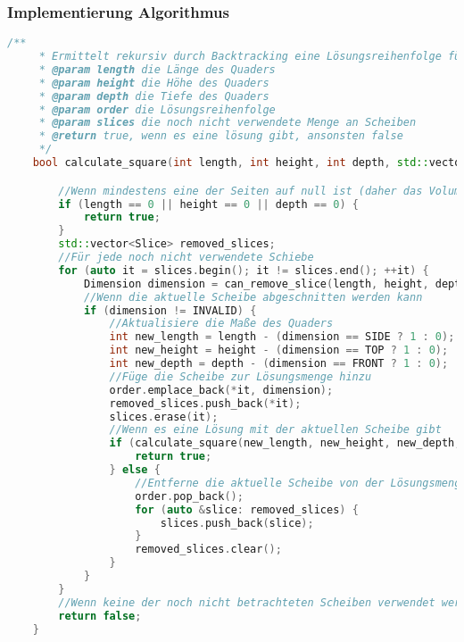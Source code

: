 \documentclass[a4paper,10pt,ngerman]{scrartcl}
\begin{document}
    \subsubsection{Implementierung Algorithmus}
    \begin{lstlisting}[frame=single,language=C++,title=Methode calculate\_square,breaklines=true,label={lst:code_calculateSquare}]
    /**
     * Ermittelt rekursiv durch Backtracking eine Lösungsreihenfolge für die gegebene Menge an Scheiben.
     * @param length die Länge des Quaders
     * @param height die Höhe des Quaders
     * @param depth die Tiefe des Quaders
     * @param order die Lösungsreihenfolge
     * @param slices die noch nicht verwendete Menge an Scheiben
     * @return true, wenn es eine lösung gibt, ansonsten false
     */
    bool calculate_square(int length, int height, int depth, std::vector<std::pair<Slice, Dimension>> &order, std::vector<Slice> &slices) {

        //Wenn mindestens eine der Seiten auf null ist (daher das Volumen des Quaders null ist)
        if (length == 0 || height == 0 || depth == 0) {
            return true;
        }
        std::vector<Slice> removed_slices;
        //Für jede noch nicht verwendete Schiebe
        for (auto it = slices.begin(); it != slices.end(); ++it) {
            Dimension dimension = can_remove_slice(length, height, depth, *it);
            //Wenn die aktuelle Scheibe abgeschnitten werden kann
            if (dimension != INVALID) {
                //Aktualisiere die Maße des Quaders
                int new_length = length - (dimension == SIDE ? 1 : 0);
                int new_height = height - (dimension == TOP ? 1 : 0);
                int new_depth = depth - (dimension == FRONT ? 1 : 0);
                //Füge die Scheibe zur Lösungsmenge hinzu
                order.emplace_back(*it, dimension);
                removed_slices.push_back(*it);
                slices.erase(it);
                //Wenn es eine Lösung mit der aktuellen Scheibe gibt
                if (calculate_square(new_length, new_height, new_depth, order, slices)) {
                    return true;
                } else {
                    //Entferne die aktuelle Scheibe von der Lösungsmenge
                    order.pop_back();
                    for (auto &slice: removed_slices) {
                        slices.push_back(slice);
                    }
                    removed_slices.clear();
                }
            }
        }
        //Wenn keine der noch nicht betrachteten Scheiben verwendet werden kann
        return false;
    }
    \end{lstlisting}
\end{document}
